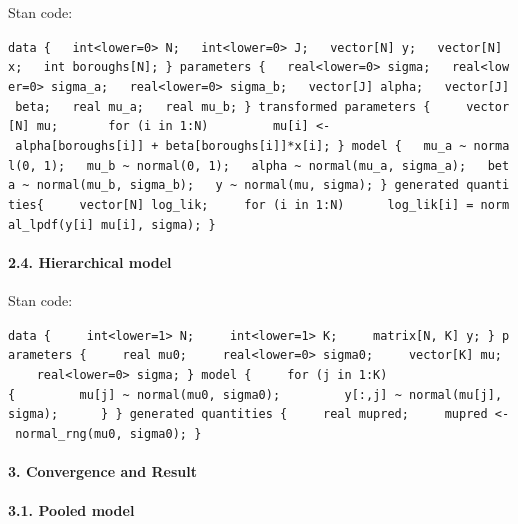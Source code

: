 \documentclass[11pt]{article}
\begin{document}
Stan code:

    \texttt{data\ \{\ \ \ int\textless{}lower=0\textgreater{}\ N;\ \ \ int\textless{}lower=0\textgreater{}\ J;\ \ \ vector{[}N{]}\ y;\ \ \ vector{[}N{]}\ x;\ \ \ int\ boroughs{[}N{]};\ \}\ parameters\ \{\ \ \ real\textless{}lower=0\textgreater{}\ sigma;\ \ \ real\textless{}lower=0\textgreater{}\ sigma\_a;\ \ \ real\textless{}lower=0\textgreater{}\ sigma\_b;\ \ \ vector{[}J{]}\ alpha;\ \ \ vector{[}J{]}\ beta;\ \ \ real\ mu\_a;\ \ \ real\ mu\_b;\ \}\ transformed\ parameters\ \{\ \ \ \ \ vector{[}N{]}\ mu;\ \ \ \ \ \ \ for\ (i\ in\ 1:N)\ \ \ \ \ \ \ \ \ mu{[}i{]}\ \textless{}-\ alpha{[}boroughs{[}i{]}{]}\ +\ beta{[}boroughs{[}i{]}{]}*x{[}i{]};\ \}\ model\ \{\ \ \ mu\_a\ \textasciitilde{}\ normal(0,\ 1);\ \ \ mu\_b\ \textasciitilde{}\ normal(0,\ 1);\ \ \ alpha\ \textasciitilde{}\ normal(mu\_a,\ sigma\_a);\ \ \ beta\ \textasciitilde{}\ normal(mu\_b,\ sigma\_b);\ \ \ y\ \textasciitilde{}\ normal(mu,\ sigma);\ \}\ generated\ quantities\{\ \ \ \ \ vector{[}N{]}\ log\_lik;\ \ \ \ \ for\ (i\ in\ 1:N)\ \ \ \ \ \ log\_lik{[}i{]}\ =\ normal\_lpdf(y{[}i{]}\textbar{}\ mu{[}i{]},\ sigma);\ \}}

    \paragraph{2.4. Hierarchical model}\label{hierarchical-model}

Stan code:

    \texttt{data\ \{\ \ \ \ \ int\textless{}lower=1\textgreater{}\ N;\ \ \ \ \ int\textless{}lower=1\textgreater{}\ K;\ \ \ \ \ matrix{[}N,\ K{]}\ y;\ \}\ parameters\ \{\ \ \ \ \ real\ mu0;\ \ \ \ \ real\textless{}lower=0\textgreater{}\ sigma0;\ \ \ \ \ vector{[}K{]}\ mu;\ \ \ \ \ real\textless{}lower=0\textgreater{}\ sigma;\ \}\ model\ \{\ \ \ \ \ for\ (j\ in\ 1:K)\{\ \ \ \ \ \ \ \ \ mu{[}j{]}\ \textasciitilde{}\ normal(mu0,\ sigma0);\ \ \ \ \ \ \ \ \ y{[}:,j{]}\ \textasciitilde{}\ normal(mu{[}j{]},\ sigma);\ \ \ \ \ \ \}\ \}\ generated\ quantities\ \{\ \ \ \ \ real\ mupred;\ \ \ \ \ mupred\ \textless{}-\ normal\_rng(mu0,\ sigma0);\ \}}

    \paragraph{3. Convergence and Result}\label{convergence-and-result}

\paragraph{3.1. Pooled model}\label{pooled-model}
\end{document}
